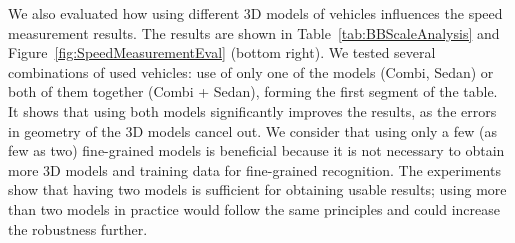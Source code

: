 \documentclass[]{elsarticle}
\begin{document}
We also evaluated how using different 3D models of vehicles influences the speed measurement results. The results are shown in Table~\ref{tab:BBScaleAnalysis} and Figure~\ref{fig:SpeedMeasurementEval} (bottom right).
We tested several combinations of used vehicles: use of only one of the models (Combi, Sedan) or both of them together (Combi + Sedan), forming the first segment of the table. It shows that using both models significantly improves the results, as the errors in geometry of the 3D models cancel out. 
We consider that using only a few (as few as two) fine-grained models is beneficial because it is not necessary to obtain more 3D models and training data for fine-grained recognition.  
The experiments show that having two models is sufficient for obtaining usable results; using more than two models in practice would follow the same principles and could increase the robustness further.
\end{document}
